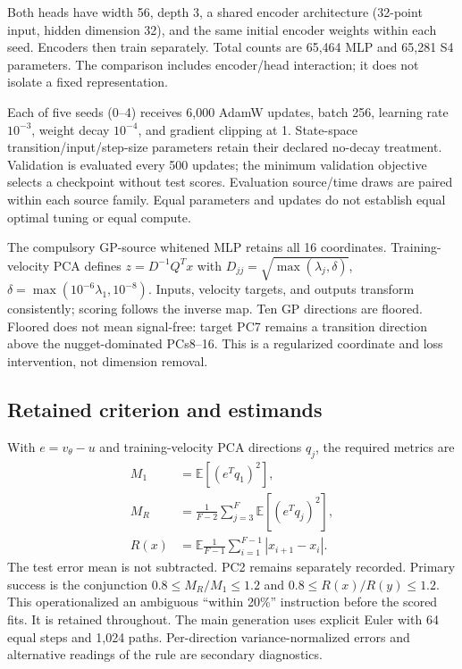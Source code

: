 \documentclass[10pt,twocolumn]{article}
\newcommand{\E}{\mathbb{E}}
\begin{document}
Both heads have width 56, depth 3, a shared encoder architecture (32-point input, hidden dimension 32), and the same initial encoder weights within each seed. Encoders then train separately. Total counts are 65,464 MLP and 65,281 S4 parameters. The comparison includes encoder/head interaction; it does not isolate a fixed representation.

Each of five seeds (0--4) receives 6,000 AdamW updates, batch 256, learning rate $10^{-3}$, weight decay $10^{-4}$, and gradient clipping at 1. State-space transition/input/step-size parameters retain their declared no-decay treatment. Validation is evaluated every 500 updates; the minimum validation objective selects a checkpoint without test scores. Evaluation source/time draws are paired within each source family. Equal parameters and updates do not establish equal optimal tuning or equal compute.

The compulsory GP-source whitened MLP retains all 16 coordinates. Training-velocity PCA defines $z=D^{-1}Q^Tx$ with $D_{jj}=\sqrt{\max(\lambda_j,\delta)}$, $\delta=\max(10^{-6}\lambda_1,10^{-8})$. Inputs, velocity targets, and outputs transform consistently; scoring follows the inverse map. Ten GP directions are floored. Floored does not mean signal-free: target PC7 remains a transition direction above the nugget-dominated PCs8--16. This is a regularized coordinate and loss intervention, not dimension removal.

\subsection{Retained criterion and estimands}
With $e=v_\theta-u$ and training-velocity PCA directions $q_j$, the required metrics are
\begin{align}
 M_1&=\E[(e^Tq_1)^2],\\
 M_R&=\frac{1}{F-2}\sum_{j=3}^F\E[(e^Tq_j)^2],\\
 R(x)&=\E\frac{1}{F-1}\sum_{i=1}^{F-1}|x_{i+1}-x_i|.
\end{align}
The test error mean is not subtracted. PC2 remains separately recorded. Primary success is the conjunction $0.8\leq M_R/M_1\leq1.2$ and $0.8\leq R(x)/R(y)\leq1.2$. This operationalized an ambiguous ``within 20\%'' instruction before the scored fits. It is retained throughout. The main generation uses explicit Euler with 64 equal steps and 1,024 paths. Per-direction variance-normalized errors and alternative readings of the rule are secondary diagnostics.

\clearpage
\end{document}

